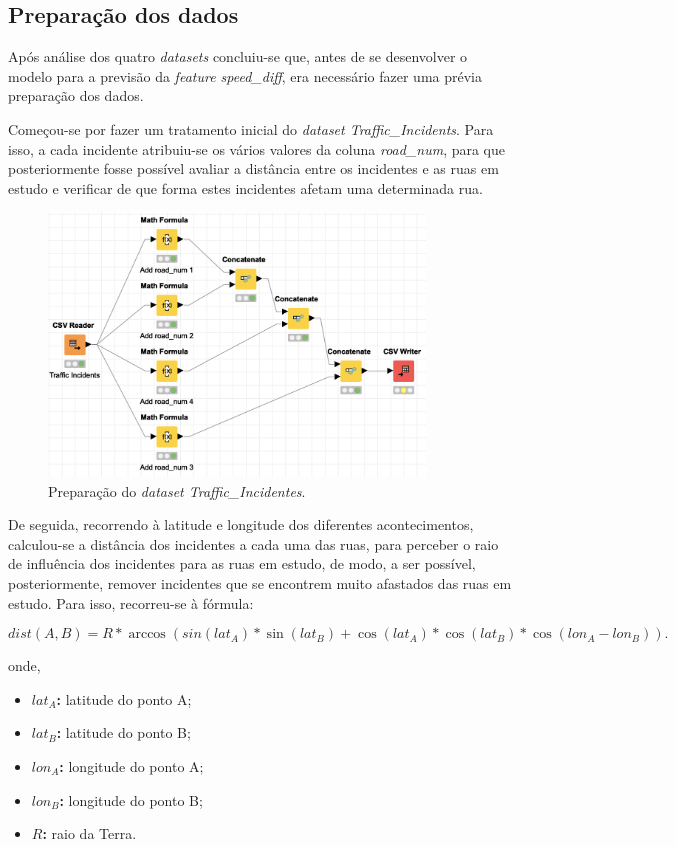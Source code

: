 \documentclass[a4paper, 12pt]{article}
\begin{document}
\subsection{Preparação dos dados}

Após análise dos quatro \textit{datasets} concluiu-se que, antes de se desenvolver o modelo para a previsão da \textit{feature speed\_diff}, era necessário fazer uma prévia preparação dos dados.

Começou-se por fazer um tratamento inicial do \textit{dataset Traffic\_Incidents}. Para isso, a cada incidente atribuiu-se os vários valores da coluna \textit{road\_num}, para que posteriormente fosse possível avaliar a distância entre os incidentes e as ruas em estudo e verificar de que forma estes incidentes afetam uma determinada rua.

\begin{figure}[H]
	\centering
	\includegraphics[width=10cm]{Traffic_Incidents}
	\caption{Preparação do \textit{dataset Traffic\_Incidentes}.}
\end{figure}

De seguida, recorrendo à latitude e longitude dos diferentes acontecimentos, calculou-se a distância dos incidentes a cada uma das ruas, para perceber o raio de influência dos incidentes para as ruas em estudo, de modo, a ser possível, posteriormente, remover incidentes que se encontrem muito afastados das ruas em estudo. Para isso, recorreu-se à fórmula:

$$dist(A, B) = R * \arccos (sin (lat_A) * \sin (lat_B) + \cos (lat_A) * \cos (lat_B) * \cos (lon_A-lon_B)). $$

onde,

\begin{itemize}
	\item \textbf{$lat_A$:} latitude do ponto A;
	\item \textbf{$lat_B$:} latitude do ponto B;
	\item \textbf{$lon_A$:} longitude do ponto A;
	\item \textbf{$lon_B$:} longitude do ponto B;
	\item \textbf{$R$:} raio da Terra.
\end{itemize}
\end{document}
